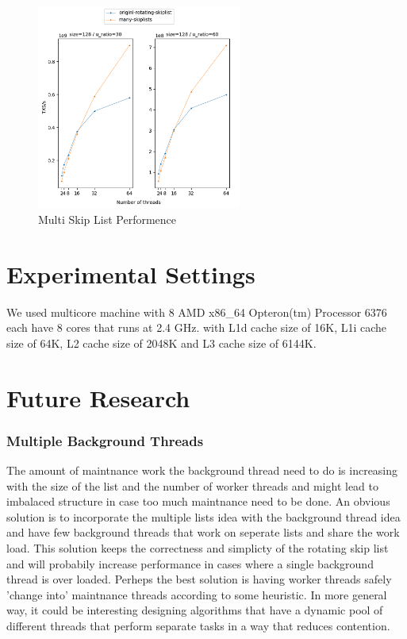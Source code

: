 \documentclass{article}
\begin{document}
\begin{figure}
	\caption{Multi Skip List Performence}
	\centering
	\includegraphics[width=0.6\textwidth]{many-skiplists_plot}
\end{figure}

\section{Experimental Settings}
\label{sec:exp}

We used multicore machine with 8 AMD x86\_64 Opteron(tm) Processor 6376 each have 8 cores that runs at 2.4 GHz. with L1d cache size of 16K, L1i cache size of 64K, L2 cache size of 2048K and L3 cache size of 6144K.

\section{Future Research}
\label{sec:foot}

\subsubsection{Multiple Background Threads}
\label{sssec:mbt}
The amount of maintnance work the background thread need to do is increasing with the size of the list and the number of worker threads and might lead to imbalaced structure in case too much maintnance need to be done. An obvious solution is to incorporate the multiple lists idea with the background thread idea and have few background threads that work on seperate lists and share the work load. This solution keeps the correctness and simplicty of the rotating skip list and will probabily increase performance in cases where a single background thread is over loaded. Perheps the best solution is having worker threads safely 'change into' maintnance threads according to some heuristic. In more general way, it could be interesting designing algorithms that have a dynamic pool of different threads that perform separate tasks in a way that reduces contention.
\end{document}
